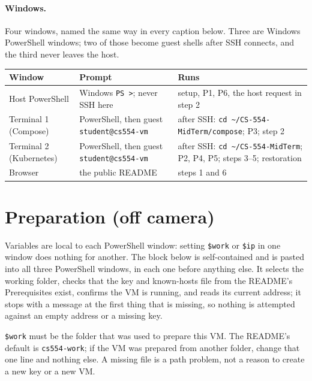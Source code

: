 \documentclass[11pt,letterpaper]{article}
\newcommand{\code}[1]{\texttt{#1}}
\begin{document}
\paragraph{Windows.} Four windows, named the same way in every caption below. Three are Windows PowerShell windows; two of those become guest shells after SSH connects, and the third never leaves the host.

\begin{center}\small
\begin{tabular}{@{}p{1.4in}p{2.0in}p{3.2in}@{}}
\toprule
Window & Prompt & Runs \\
\midrule
Host PowerShell & Windows \code{PS >}; never SSH here & setup, P1, P6, the host request in step 2 \\
Terminal 1 (Compose) & PowerShell, then guest \code{student@cs554-vm} & after SSH: \code{cd \textasciitilde/CS-554-MidTerm/compose}; P3; step 2 \\
Terminal 2 (Kubernetes) & PowerShell, then guest \code{student@cs554-vm} & after SSH: \code{cd \textasciitilde/CS-554-MidTerm}; P2, P4, P5; steps 3--5; restoration \\
Browser & the public README & steps 1 and 6 \\
\bottomrule
\end{tabular}
\end{center}

\section{Preparation (off camera)}

Variables are local to each PowerShell window: setting \code{\$work} or \code{\$ip} in one window does nothing for another. The block below is self-contained and is pasted into all three PowerShell windows, in each one before anything else. It selects the working folder, checks that the key and known-hosts file from the README's Prerequisites exist, confirms the VM is running, and reads its current address; it stops with a message at the first thing that is missing, so nothing is attempted against an empty address or a missing key.

\code{\$work} must be the folder that was used to prepare this VM. The README's default is \code{cs554-work}; if the VM was prepared from another folder, change that one line and nothing else. A missing file is a path problem, not a reason to create a new key or a new VM.
\end{document}
